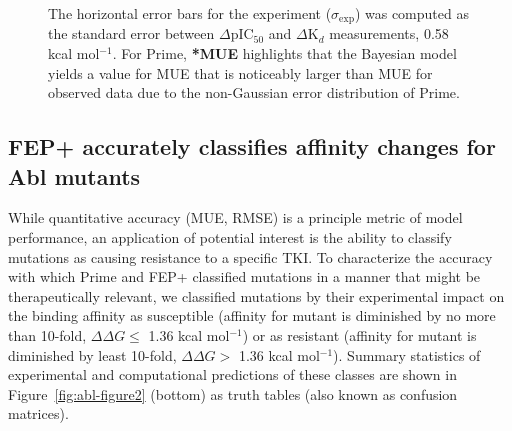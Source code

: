 \documentclass[phd,tocprelim]{cornell}
\begin{document}
\begin{landscape}
\begin{figure}
{			The horizontal error bars for the experiment ($\sigma_\mathrm{exp}$) was computed as the standard error between $\Delta$pIC$_{50}$ and $\Delta$K$_{d}$ measurements, 0.58 kcal mol$^{-1}$.
			For Prime, \textbf{*MUE} highlights that the Bayesian model yields a value for MUE that is noticeably larger than MUE for observed data due to the non-Gaussian error distribution of Prime.}
	\end{figure}
\end{landscape}

\subsection{FEP+ accurately classifies affinity changes for Abl mutants}
While quantitative accuracy (MUE, RMSE) is a principle metric of model performance, an application of potential interest is the ability to classify mutations as causing resistance to a specific TKI.
To characterize the accuracy with which Prime and FEP+ classified mutations in a manner that might be therapeutically relevant, we classified mutations by their experimental impact on the binding affinity as susceptible (affinity for mutant is diminished by no more than 10-fold, $\Delta \Delta G \leq$ 1.36 kcal mol$^{-1}$) or as resistant (affinity for mutant is diminished by least 10-fold, $\Delta \Delta G >$ 1.36 kcal mol$^{-1}$).    
Summary statistics of experimental and computational predictions of these classes are shown in Figure~\ref{fig:abl-figure2} (bottom) as truth tables (also known as confusion matrices).
\end{document}
